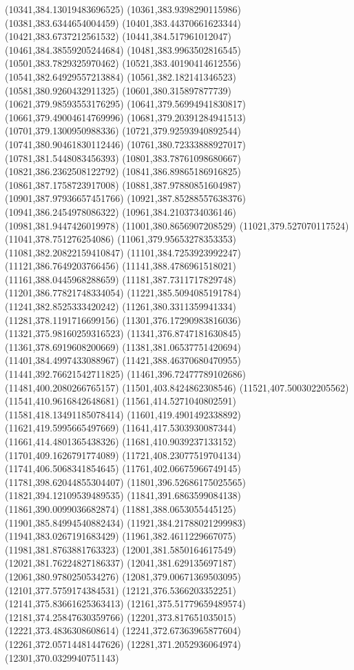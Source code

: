 {(10341,384.13019483696525)
(10361,383.9398290115986)
(10381,383.6344654004459)
(10401,383.44370661623344)
(10421,383.6737212561532)
(10441,384.517961012047)
(10461,384.38559205244684)
(10481,383.9963502816545)
(10501,383.7829325970462)
(10521,383.40190414612556)
(10541,382.64929557213884)
(10561,382.182141346523)
(10581,380.9260432911325)
(10601,380.315897877739)
(10621,379.98593553176295)
(10641,379.56994941830817)
(10661,379.49004614769996)
(10681,379.20391284941513)
(10701,379.1300950988336)
(10721,379.92593940892544)
(10741,380.90461830112446)
(10761,380.72333888927017)
(10781,381.5448083456393)
(10801,383.78761098680667)
(10821,386.2362508122792)
(10841,386.89865186916825)
(10861,387.1758723917008)
(10881,387.97880851604987)
(10901,387.97936657451766)
(10921,387.85288557638376)
(10941,386.2454978086322)
(10961,384.2103734036146)
(10981,381.9447426019978)
(11001,380.8656907208529)
(11021,379.527070117524)
(11041,378.751276254086)
(11061,379.95653278353353)
(11081,382.20822159410847)
(11101,384.7253923992247)
(11121,386.7649203766456)
(11141,388.4786961518021)
(11161,388.0445968288659)
(11181,387.7311717829748)
(11201,386.77821748334054)
(11221,385.5094085191784)
(11241,382.8525333420242)
(11261,380.3311359941334)
(11281,378.1191716699156)
(11301,376.17290983816036)
(11321,375.98160259316523)
(11341,376.8747181630845)
(11361,378.6919608200669)
(11381,381.06537751420694)
(11401,384.4997433088967)
(11421,388.46370680470955)
(11441,392.76621542711825)
(11461,396.72477789102686)
(11481,400.2080266765157)
(11501,403.8424862308546)
(11521,407.500302205562)
(11541,410.9616842648681)
(11561,414.5271040802591)
(11581,418.13491185078414)
(11601,419.4901492338892)
(11621,419.5995665497669)
(11641,417.5303930087344)
(11661,414.4801365438326)
(11681,410.9039237133152)
(11701,409.1626791774089)
(11721,408.23077519704134)
(11741,406.5068341854645)
(11761,402.06675966749145)
(11781,398.62044855304407)
(11801,396.52686175025565)
(11821,394.12109539489535)
(11841,391.6863599084138)
(11861,390.0099036682874)
(11881,388.0653055445125)
(11901,385.84994540882434)
(11921,384.21788021299983)
(11941,383.0267191683429)
(11961,382.4611229667075)
(11981,381.8763881763323)
(12001,381.5850164617549)
(12021,381.76224827186337)
(12041,381.629135697187)
(12061,380.9780250534276)
(12081,379.00671369503095)
(12101,377.5759174384531)
(12121,376.5366203352251)
(12141,375.83661625363413)
(12161,375.51779659489574)
(12181,374.25847630359766)
(12201,373.817651035015)
(12221,373.4836308608614)
(12241,372.67363965877604)
(12261,372.05714481447626)
(12281,371.2052936064974)
(12301,370.0329940751143)
}
